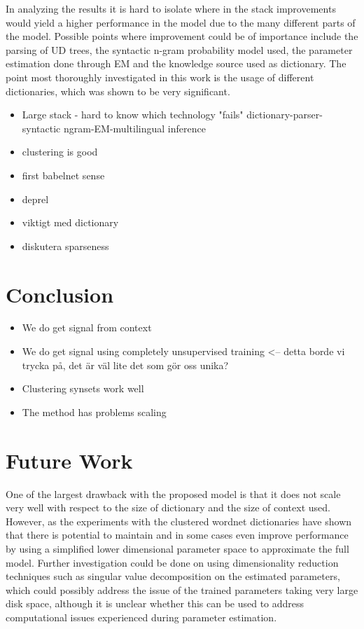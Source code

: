 In analyzing the results it is hard to isolate where in the stack improvements would yield a higher performance in the model due to the many different parts of the model. Possible points where improvement could be of importance include the parsing of UD trees, the syntactic n-gram probability model used, the parameter estimation done through EM and the knowledge source used as dictionary. The point most thoroughly investigated in this work is the usage of different dictionaries, which was shown to be very significant.
\begin{itemize}
    \item Large stack - hard to know which technology "fails" dictionary-parser-syntactic ngram-EM-multilingual inference
    \item clustering is good
    \item first babelnet sense
    \item deprel 
    \item viktigt med dictionary
    \item diskutera sparseness
\end{itemize}
\section{Conclusion}
\begin{itemize}
    \item We do get signal from context
    \item We do get signal using completely unsupervised training <-- detta borde vi trycka på, det är väl lite det som gör oss unika?
    \item Clustering synsets work well
    \item The method has problems scaling
    
\end{itemize}
\section{Future Work}
One of the largest drawback with the proposed model is that it does not scale very well with respect to the size of dictionary and the size of context used. However, as the experiments with the clustered wordnet dictionaries have shown that there is potential to maintain and in some cases even improve performance by using  a simplified lower dimensional parameter space to approximate the full model. Further investigation could be done on using dimensionality reduction techniques such as singular value decomposition on the estimated parameters, which could possibly address the issue of the trained parameters taking very large disk space, although it is unclear whether this can be used to address computational issues experienced during parameter estimation. 

